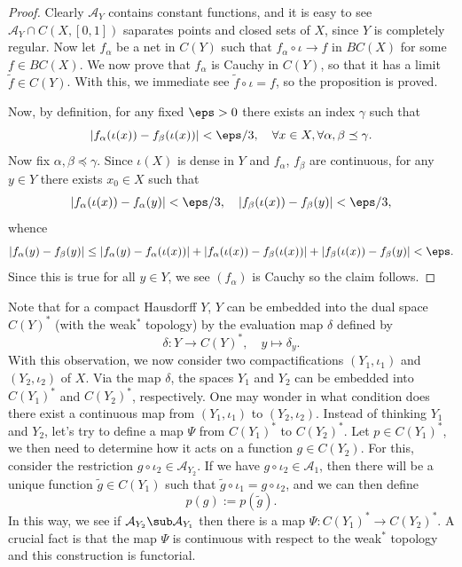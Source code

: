 \begin{proof}
Clearly $\mathcal{A}_Y$ contains constant functions, and it is easy to see $\mathcal{A}_Y\cap C(X,[0,1])$ saparates points and closed sets of $X$, since $Y$ is completely regular. Now let $f_\alpha$ be a net in $C(Y)$ such that $f_\alpha\circ\iota\to f$ in $BC(X)$ for some $f\in BC(X)$. We now prove that $f_\alpha$ is Cauchy in $C(Y)$, so that it has a limit $\tilde{f}\in C(Y)$. With this, we immediate see $\tilde{f}\circ\iota=f$, so the proposition is proved.\par
Now, by definition, for any fixed $\eps>0$ there exists an index $\gamma$ such that
\[|f_\alpha(\iota(x))-f_\beta(\iota(x))|<\eps/3,\quad\forall x\in X,\forall\alpha,\beta\preceq\gamma.\]
Now fix $\alpha,\beta\preceq\gamma$. Since $\iota(X)$ is dense in $Y$ and $f_\alpha$, $f_\beta$ are continuous, for any $y\in Y$ there exists $x_0\in X$ such that 
\[|f_\alpha(\iota(x))-f_\alpha(y)|<\eps/3,\quad |f_\beta(\iota(x))-f_\beta(y)|<\eps/3,\]
whence
\[|f_\alpha(y)-f_\beta(y)|\leq|f_\alpha(y)-f_\alpha(\iota(x))|+|f_\alpha(\iota(x))-f_\beta(\iota(x))|+|f_\beta(\iota(x))-f_\beta(y)|<\eps.\]
Since this is true for all $y\in Y$, we see $(f_\alpha)$ is Cauchy so the claim follows.
\end{proof}
Note that for a compact Hausdorff $Y$, $Y$ can be embedded into the dual space $C(Y)^*$ (with the weak$^*$ topology) by the evaluation map $\delta$ defined by
\[\delta:Y\to C(Y)^*,\quad y\mapsto\delta_y.\]
With this observation, we now consider two compactifications $(Y_1,\iota_1)$ and $(Y_2,\iota_2)$ of $X$. Via the map $\delta$, the spaces $Y_1$ and $Y_2$ can be embedded into $C(Y_1)^*$ and $C(Y_2)^*$, respectively. One may wonder in what condition does there exist a continuous map from $(Y_1,\iota_1)$ to $(Y_2,\iota_2)$. Instead of thinking $Y_1$ and $Y_2$, let's try to define a map $\Psi$ from $C(Y_1)^*$ to $C(Y_2)^*$. Let $p\in C(Y_1)^*$, we then need to determine how it acts on a function $g\in C(Y_2)$. For this, consider the restriction $g\circ\iota_2\in\mathcal{A}_{Y_2}$. If we have $g\circ\iota_2\in\mathcal{A}_1$, then there will be a unique function $\tilde{g}\in C(Y_1)$ such that $\tilde{g}\circ\iota_1=g\circ\iota_2$, and we can then define
\[p(g):=p(\tilde{g}).\]
In this way, we see if $\mathcal{A}_{Y_2}\sub\mathcal{A}_{Y_1}$ then there is a map $\Psi:C(Y_1)^*\to C(Y_2)^*$. A crucial fact is that the map $\Psi$ is continuous with respect to the weak$^*$ topology and this construction is functorial.
